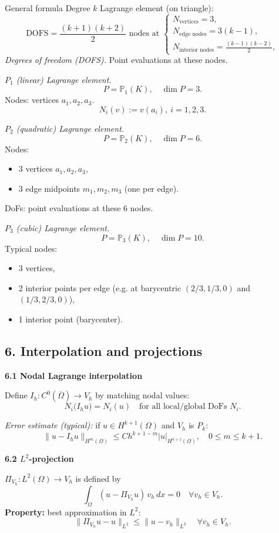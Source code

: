 General formula Degree $k$ Lagrange element (on triangle):
\[
    \text{DOFS} =
    \frac{(k + 1)(k + 2)}{2} \text{ nodes at }
    \begin{cases}
        N_{\text{vertices}} = 3,          \\
        N_{\text{edge nodes}} = 3(k - 1), \\
        N_{\text{interior nodes}} = \frac{(k - 1)(k - 2)}{2},
    \end{cases}
\]
\emph{Degrees of freedom (DOFS).} Point evaluations at these nodes.


\emph{$P_1$ (linear) Lagrange element.}
\[
    P = \mathbb{P}_1(K),\quad \dim P=3.
\]
Nodes: vertices $a_1,a_2,a_3$.
\[
    N_i(v) := v(a_i),\ i=1,2,3.
\]

\emph{$P_2$ (quadratic) Lagrange element.}
\[
    P = \mathbb{P}_2(K),\quad \dim P=6.
\]
Nodes:
\begin{itemize}
    \item 3 vertices $a_1,a_2,a_3$,
    \item 3 edge midpoints $m_1,m_2,m_3$ (one per edge).
\end{itemize}
DoFs: point evaluations at these 6 nodes.

\emph{$P_3$ (cubic) Lagrange element.}
\[
    P = \mathbb{P}_3(K),\quad \dim P=10.
\]
Typical nodes:
\begin{itemize}
    \item 3 vertices,
    \item 2 interior points per edge (e.g. at barycentric $(2/3,1/3,0)$ and $(1/3,2/3,0)$),
    \item 1 interior point (barycenter).
\end{itemize}

\subsection*{6. Interpolation and projections}

\textbf{6.1 Nodal Lagrange interpolation}

Define $I_h:C^0(\overline{\Omega})\to V_h$ by matching nodal values:
\[
    N_i\bigl(I_h u\bigr) = N_i(u)
    \quad\text{for all local/global DoFs }N_i.
\]

\emph{Error estimate (typical):} if $u\in H^{k+1}(\Omega)$ and $V_h$ is $P_k$:
\[
    \|u - I_h u\|_{H^m(\Omega)} \le C h^{k+1-m} |u|_{H^{k+1}(\Omega)},
    \quad 0\le m\le k+1.
\]

\textbf{6.2 $L^2$-projection}

$\Pi_{V_h}:L^2(\Omega)\to V_h$ is defined by
\[
    \int_\Omega (u - \Pi_{V_h}u)\,v_h\,dx = 0
    \quad\forall v_h\in V_h.
\]
\textbf{Property:} best approximation in $L^2$:
\[
    \|\Pi_{V_h}u - u\|_{L^2} \le \|u - v_h\|_{L^2}\quad\forall v_h\in V_h.
\]

